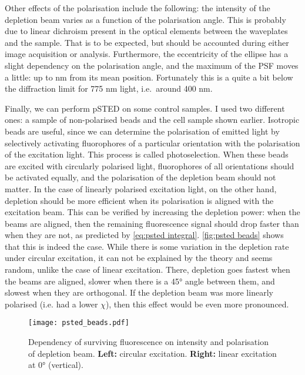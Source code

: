 Other effects of the polarisation include the following: the intensity of the depletion beam varies as a function of the polarisation angle. This is probably due to linear dichroism present in the optical elements between the waveplates and the sample. That is to be expected, but should be accounted during either image acquisition or analysis. Furthermore, the eccentricity of the ellipse has a slight dependency on the polarisation angle, and the maximum of the PSF moves a little: up to  nm from its mean position. Fortunately this is a quite a bit below the diffraction limit for 775 nm light, i.e.~around 400 nm. 


Finally, we can perform pSTED on some control samples. I used two different ones: a sample of non-polarised beads and the cell sample shown earlier. Isotropic beads are useful, since we can determine the polarisation of emitted light by selectively activating fluorophores of a particular orientation with the polarisation of the excitation light. This process is called photoselection. When these beads are excited with circularly polarised light, fluorophores of all orientations should be activated equally, and the polarisation of the depletion beam should not matter. In the case of linearly polarised excitation light, on the other hand, depletion should be more efficient when its polarisation is aligned with the excitation beam. This can be verified by increasing the depletion power: when the beams are aligned, then the remaining fluorescence signal should drop faster than when they are not, as predicted by \autoref{eq:psted integral}. \autoref{fig:psted beads} shows that this is indeed the case. While there is some variation in the depletion rate under circular excitation, it can not be explained by the theory and seems random, unlike the case of linear excitation. There, depletion goes fastest when the beams are aligned, slower when there is a 45° angle between them, and slowest when they are orthogonal. If the depletion beam was more linearly polarised (i.e. had a lower $ \chi $), then this effect would be even more pronounced.

\begin{figure}
	\centering
	\texttt{[image: psted\_beads.pdf]}
	\caption{
		Dependency of surviving fluorescence on intensity and polarisation of depletion beam. \textbf{Left:} circular excitation. \textbf{Right:} linear excitation at 0° (vertical). 
	}
	\label{fig:psted beads}
\end{figure}





























